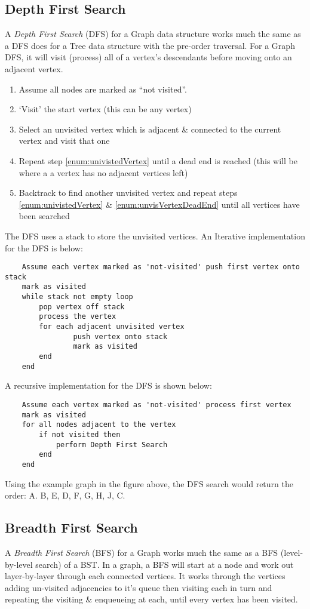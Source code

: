 \subsection{Depth First Search}
A \textit{Depth First Search} (DFS) for a Graph data structure works much the same as a DFS does for a Tree data structure with the pre-order traversal. For a Graph DFS, it will visit (process) all of a vertex's descendants before moving onto an adjacent vertex. 
\begin{enumerate}
    \item Assume all nodes are marked as ``not visited''.
    \item `Visit' the start vertex (this can be any vertex)
    \item \label{enum:univistedVertex} Select an unvisited vertex which is adjacent \& connected to the current vertex and visit that one
    \item \label{enum:unvisVertexDeadEnd} Repeat step \ref{enum:univistedVertex} until a dead end is reached (this will be where a a vertex has no adjacent vertices left)
    \item Backtrack to find another unvisited vertex and repeat steps \ref{enum:univistedVertex} \& \ref{enum:unvisVertexDeadEnd} until all vertices have been searched 
\end{enumerate}
The DFS uses a stack to store the unvisited vertices. An Iterative implementation for the DFS is below:
\begin{verbatim}
    Assume each vertex marked as 'not-visited' push first vertex onto stack
    mark as visited
    while stack not empty loop
        pop vertex off stack
        process the vertex
        for each adjacent unvisited vertex
                push vertex onto stack
                mark as visited
        end
    end
\end{verbatim}

A recursive implementation for the DFS is shown below:
\begin{verbatim}
    Assume each vertex marked as 'not-visited' process first vertex
    mark as visited
    for all nodes adjacent to the vertex
        if not visited then
            perform Depth First Search
        end
    end
\end{verbatim}
Using the example graph in the figure above, the DFS search would return the order: A. B, E, D, F, G, H, J, C.

\subsection{Breadth First Search}
A \textit{Breadth First Search} (BFS) for a Graph works much the same as a BFS (level-by-level search) of a BST. In a graph, a BFS will start at a node and work out layer-by-layer through each connected vertices. It works through the vertices adding un-visited adjacencies to it's queue then visiting each in turn and repeating the visiting \& enqueueing at each, until every vertex has been visited. \\

